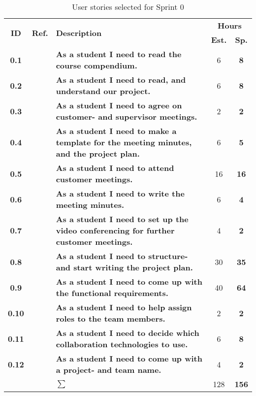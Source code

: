 \begin{table*}[!ht]
\caption{User stories selected for Sprint 0}
\label{tab:sprint0stories}
\def\arraystretch{1.25}
\begin{tabularx}{\textwidth}{ccXcc} 
\toprule[0.5mm]

\multirow{2}{*}{\textbf{ID}} &
\multirow{2}{*}{\textbf{Ref.}} & \multirow{2}{*}{\textbf{Description}} & \multicolumn{2}{c}{\textbf{Hours}} \\
 					& & & \textbf{Est.} & \textbf{Sp.} \\

\midrule
\textbf{0.1} 	&
	& \textbf{As a student I need to read the course compendium.} 										& 		6	& \textbf{8} \\

\textbf{0.2} 	&
	& \textbf{As a student I need to read, and understand our project.} 								& 		6	& \textbf{8} \\	


\textbf{0.3} 	&
	& \textbf{As a student I need to agree on customer- and supervisor meetings.} 						& 		2	& \textbf{2} \\


\textbf{0.4} 	& 
	& {\bf As a student I need to make a template for the meeting minutes, and the project plan.} 		& 		6	& \textbf{5} \\

\textbf{0.5} 	&
	& \textbf{As a student I need to attend customer meetings.} 										&  		16	& \textbf{16} \\

\textbf{0.6} 	&
	& \textbf{As a student I need to write the meeting minutes.} 										&  		6	& \textbf{4} \\

\textbf{0.7} 	&
	& \textbf{As a student I need to set up the video conferencing for further customer meetings.} 		& 		4	& \textbf{2} \\

\textbf{0.8} 	&
	& \textbf{As a student I need to structure- and start writing the project plan.} 					&  		30	& \textbf{35} \\

\textbf{0.9} 	&
	& \textbf{As a student I need to come up with the functional requirements.} 						&  		40	& \textbf{64} \\

\textbf{0.10} 	&
	& \textbf{As a student I need to help assign roles to the team members.} 							& 		2	& \textbf{2} \\

\textbf{0.11} 	&
	& \textbf{As a student I need to decide which collaboration technologies to use.} 					& 		6	& \textbf{8} \\

\textbf{0.12} 	& 
	& \textbf{As a student I need to come up with a project- and team name.} 							& 		4	& \textbf{2} \\
\midrule
				&& \textbf{$\sum$}		&		128	& \textbf{156}
 \\																			
\bottomrule[0.5mm]
\end{tabularx}
\end{table*}